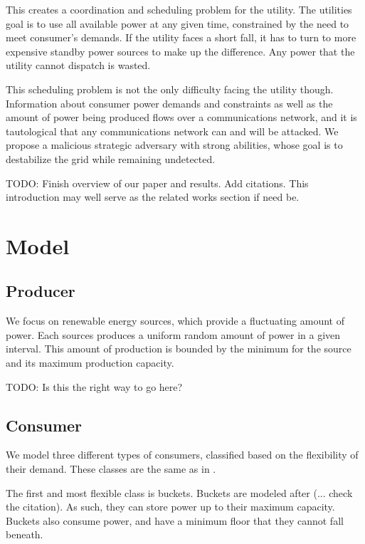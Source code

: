 \documentclass[conference]{IEEEtran}
\begin{document}
This creates a coordination and scheduling problem for the utility.  The utilities goal is to use all available power at any
given time, constrained by the need to meet consumer's demands.  If the utility faces a short fall, it has to turn to more 
expensive standby power sources to make up the difference.  Any power that the utility cannot dispatch is wasted.

This scheduling problem is not the only difficulty facing the utility though.  Information about consumer power demands and 
constraints as well as the amount of power being produced flows over a communications network, and it is tautological that 
any communications network can and will be attacked.  We propose a malicious strategic adversary with strong abilities, whose
goal is to destabilize the grid while remaining undetected. 

TODO: Finish overview of our paper and results.  Add citations.  This introduction may well serve as the related works 
section if need be.

\section{Model}

\subsection{Producer}

We focus on renewable energy sources, which provide a fluctuating amount of power.  Each sources produces a uniform random 
amount of power in a given interval.  This amount of production is bounded by the minimum for the source and its maximum
production capacity.

TODO: Is this the right way to go here?

\subsection{Consumer}

We model three different types of consumers, classified based on the flexibility of their demand.  These classes are the same as 
in \cite{petersen2013taxonomy}.

The first and most flexible class is buckets.  Buckets are modeled after (... check the citation).  As such, they can store
power up to their maximum capacity.  Buckets also consume power, and have a minimum floor that they cannot fall beneath.
\end{document}
